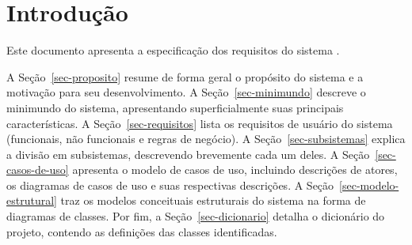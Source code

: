 \chapter{Introdução}
\label{sec-intro}

Este documento apresenta a especificação dos requisitos do sistema \emph{\imprimirtitulo}.


A Seção~\ref{sec-proposito} resume de forma geral o propósito do sistema e a motivação para seu desenvolvimento. 
A Seção~\ref{sec-minimundo} descreve o minimundo do sistema, apresentando superficialmente suas principais características. 
A Seção~\ref{sec-requisitos} lista os requisitos de usuário do sistema (funcionais, não funcionais e regras de negócio). 
A Seção~\ref{sec-subsistemas} explica a divisão em subsistemas, descrevendo brevemente cada um deles. 
A Seção~\ref{sec-casos-de-uso} apresenta o modelo de casos de uso, incluindo descrições de atores, os diagramas de casos de uso e suas respectivas descrições. 
A Seção~\ref{sec-modelo-estrutural} traz os modelos conceituais estruturais do sistema na forma de diagramas de classes.  Por fim, a Seção~\ref{sec-dicionario} detalha o dicionário do projeto, contendo as definições das classes identificadas.
